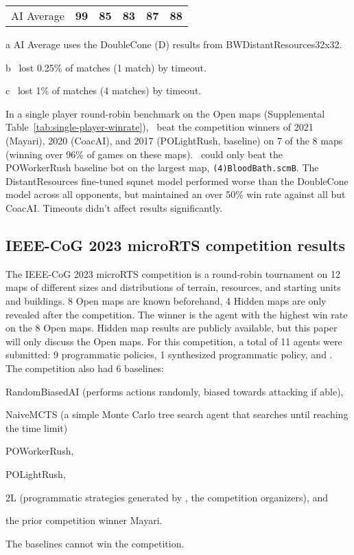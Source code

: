 \documentclass[conference]{IEEEtran}
\begin{document}
\begin{table}[t]
\begin{threeparttable}
\begin{tabular}{lcccc|c}
    \hline
    AI Average\tnote{a} & \textbf{99} & \textbf{85} & \textbf{83} & \textbf{87} & \textbf{88} \\
    \end{tabular}
    \begin{tablenotes}
    \item[a] AI Average uses the DoubleCone (D) results from BWDistantResources32x32.
    \item[b] \agentName\ lost 0.25\% of matches (1 match) by timeout.
    \item[c] \agentName\ lost  1\% of matches (4 matches) by timeout.
    \end{tablenotes}
    \end{threeparttable}
\end{table}

In a single player round-robin benchmark on the Open maps (Supplemental Table~\ref{tab:single-player-winrate}), \agentName\
beat the competition winners of 2021 (Mayari), 2020 (CoacAI), and 2017 (POLightRush,
baseline) on 7 of the 8 maps (winning over 96\% of games on these maps). \agentName\
could only beat the POWorkerRush baseline bot on the largest map,
\texttt{(4)BloodBath.scmB}. The DistantResources fine-tuned squnet model performed worse than the DoubleCone model
across all opponents, but maintained an over 50\% win rate against all but CoacAI. Timeouts didn't affect results significantly.

\subsection{IEEE-CoG 2023 microRTS competition results}
The IEEE-CoG 2023 microRTS competition is a round-robin tournament on 12 maps of
different sizes and distributions of terrain, resources, and starting units and
buildings. 8 Open maps are known beforehand, 4 Hidden maps are only revealed after the
competition. The winner is the agent with the highest win rate on the 8 Open maps.
Hidden map results are publicly available, but this paper will only discuss
the Open maps. For
this competition, a total of 11 agents were submitted: 9 programmatic policies, 1
synthesized programmatic policy, and \agentName. The competition also had 6
baselines:
\begin{inparaenum}[(1)]
    \item RandomBiasedAI (performs actions randomly, biased towards attacking if able),
    \item NaiveMCTS (a simple Monte Carlo tree search agent that searches until reaching
    the time limit)
    \item POWorkerRush,
    \item POLightRush,
    \item 2L (programmatic strategies generated by \cite{DBLP:conf/ijcai/MoraesAFL23}, the
    competition organizers), and
    \item the prior competition winner Mayari.
\end{inparaenum}
The baselines cannot win the competition.
\end{document}
